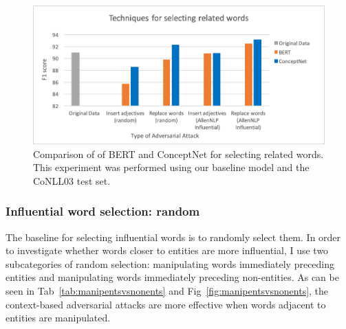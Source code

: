  \begin{figure}[h]
	\centering
	\includegraphics[width=0.85\linewidth]{LatexDiss/figures/relatedwords.png}
	\caption{Comparison of of BERT and ConceptNet for selecting related words. This experiment was performed using our baseline model and the CoNLL03 test set.}
	\label{fig:relatedwords}
\end{figure}


\subsubsection{Influential word selection: random}
\label{sec:randomselection}
The baseline for selecting influential words is to randomly select them. In order to investigate whether words closer to entities are more influential, I use two subcategories of random selection: manipulating words immediately preceding entities and manipulating words immediately preceding non-entities. As can be seen in Tab~\ref{tab:manipentsvsnonents} and Fig~\ref{fig:manipentsvsnonents}, the context-based adversarial attacks are more effective when words adjacent to entities are manipulated. 

